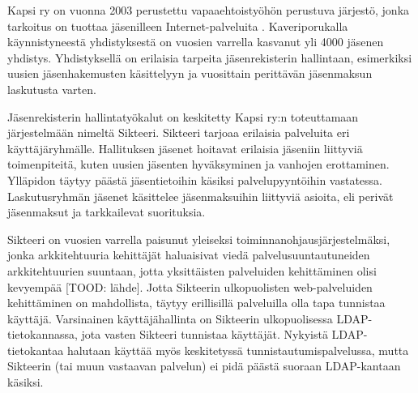 Kapsi ry on vuonna 2003 perustettu vapaaehtoistyöhön perustuva järjestö, jonka tarkoitus on tuottaa jäsenilleen Internet-palveluita \cite{kapsifi}. Kaveriporukalla käynnistyneestä yhdistyksestä on vuosien varrella kasvanut yli 4000 jäsenen yhdistys. Yhdistyksellä on erilaisia tarpeita jäsenrekisterin hallintaan, esimerkiksi uusien jäsenhakemusten käsittelyyn ja vuosittain perittävän jäsenmaksun laskutusta varten.

Jäsenrekisterin hallintatyökalut on keskitetty Kapsi ry:n toteuttamaan järjestelmään nimeltä Sikteeri. Sikteeri tarjoaa erilaisia palveluita eri käyttäjäryhmälle. Hallituksen jäsenet hoitavat erilaisia jäseniin liittyviä toimenpiteitä, kuten uusien jäsenten hyväksyminen ja vanhojen erottaminen. Ylläpidon täytyy päästä jäsentietoihin käsiksi palvelupyyntöihin vastatessa. Laskutusryhmän jäsenet käsittelee jäsenmaksuihin liittyviä asioita, eli perivät jäsenmaksut ja tarkkailevat suorituksia.

Sikteeri on vuosien varrella paisunut yleiseksi toiminnanohjausjärjestelmäksi, jonka arkkitehtuuria kehittäjät haluaisivat viedä palvelusuuntautuneiden arkkitehtuurien suuntaan, jotta yksittäisten palveluiden kehittäminen olisi kevyempää [TOOD: lähde]. Jotta Sikteerin ulkopuolisten web-palveluiden kehittäminen on mahdollista, täytyy erillisillä palveluilla olla tapa tunnistaa käyttäjä. Varsinainen käyttäjähallinta on Sikteerin ulkopuolisessa LDAP-tietokannassa, jota vasten Sikteeri tunnistaa käyttäjät. Nykyistä LDAP-tietokantaa halutaan käyttää myös keskitetyssä tunnistautumispalvelussa, mutta Sikteerin (tai muun vastaavan palvelun) ei pidä päästä suoraan LDAP-kantaan käsiksi.